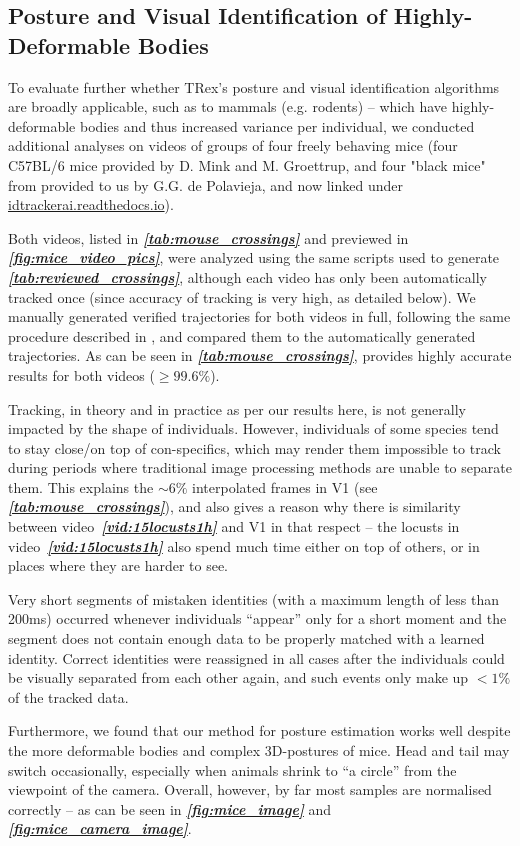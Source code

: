 \documentclass[9pt,lineno]{elife}
\newcommand{\figref}[1]{\textit{\textbf{\ref{#1}}}}
\newcommand{\tableref}[1]{\textit{\textbf{\ref{tab:#1}}}\xspace}
\newcommand{\videoref}[1]{video~\textit{\textbf{\ref{#1}}}}
\newcommand{\TRex}{\protect\path{TRex}}
\begin{document}
\begin{appendixbox}
{\color{blue}
\section{Posture and Visual Identification of Highly-Deformable Bodies} \label{sec:deformable_bodies}

To evaluate further whether TRex's posture and visual identification algorithms are broadly applicable, such as to mammals (e.g. rodents) -- which have highly-deformable bodies and thus increased variance per individual, we conducted additional analyses on videos of groups of four freely behaving mice (four C57BL/6 mice provided by D. Mink and M. Groettrup, and four "black mice" from \cite{idtrackerai} provided to us by G.G. de Polavieja, and now linked under \href{https://idtrackerai.readthedocs.io/en/latest/data.html}{idtrackerai.readthedocs.io}).

Both videos, listed in \tableref{mouse_crossings} and previewed in \figref{fig:mice_video_pics}, were analyzed using the same scripts used to generate \tableref{reviewed_crossings}, although each video has only been automatically tracked once (since accuracy of tracking is very high, as detailed below). We manually generated verified trajectories for both videos in full, following the same procedure described in , and compared them to the automatically generated trajectories. As can be seen in \tableref{mouse_crossings}, \TRex{} provides highly accurate results for both videos ($\geq 99.6\%$).

Tracking, in theory and in practice as per our results here, is not generally impacted by the shape of individuals. However, individuals of some species tend to stay close/on top of con-specifics, which may render them impossible to track during periods where traditional image processing methods are unable to separate them. This explains the $\sim6\%$ interpolated frames in V1 (see \tableref{mouse_crossings}), and also gives a reason why there is similarity between \videoref{vid:15locusts1h} and V1 in that respect -- the locusts in \videoref{vid:15locusts1h} also spend much time either on top of others, or in places where they are harder to see.

Very short segments of mistaken identities (with a maximum length of less than 200ms) occurred whenever individuals “appear” only for a short moment and the segment does not contain enough data to be properly matched with a learned identity. Correct identities were reassigned in all cases after the individuals could be visually separated from each other again, and such events only make up $<1\%$ of the tracked data.

Furthermore, we found that our method for posture estimation works well despite the more deformable bodies and complex 3D-postures of mice. Head and tail may switch occasionally, especially when animals shrink to “a circle” from the viewpoint of the camera. Overall, however, by far most samples are normalised correctly -- as can be seen in \figref{fig:mice_image} and \figref{fig:mice_camera_image}.}

\end{appendixbox}
\end{document}
